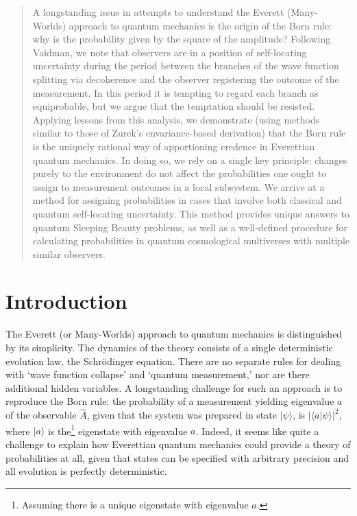 \documentclass[onecolumn,secnumarabic,amsmath,amssymb,balancelastpage,nofootinbib]{article}
\begin{document}
\maketitle
\begin{abstract}
A longstanding issue in attempts to understand the Everett (Many-Worlds) approach to quantum mechanics is the origin of the Born rule: why is the probability given by the square of the amplitude? Following Vaidman, we note that observers are in a position of self-locating uncertainty during the period between the branches of the wave function splitting via decoherence and the observer registering the outcome of the measurement. In this period it is tempting to regard each branch as equiprobable, but we argue that the temptation should be resisted.  Applying lessons from this analysis, we demonstrate (using methods similar to those of Zurek's envariance-based derivation) that the Born rule is the uniquely rational way of apportioning credence in Everettian quantum mechanics.  In doing so, we rely on a single key principle: changes purely to the environment do not affect the probabilities one ought to assign to measurement outcomes in a local subsystem.  We arrive at a method for assigning probabilities in cases that involve both classical and quantum self-locating uncertainty. This method provides unique answers to quantum Sleeping Beauty problems, as well as a well-defined procedure for calculating probabilities in quantum cosmological multiverses with multiple similar observers.
\end{abstract}
\newpage

\tableofcontents

\newpage

\section{Introduction}

The Everett (or Many-Worlds) approach to quantum mechanics is distinguished by its simplicity. The dynamics of the theory consists of a single deterministic evolution law, the Schr\"odinger equation.   There are no separate rules for dealing with `wave function collapse' and `quantum measurement,' nor are there additional hidden variables. A longstanding challenge for such an approach is to reproduce the Born rule: the probability of a measurement yielding eigenvalue $a$ of the observable $\widehat{A}$, given that the system was prepared in state $|\psi\rangle$, is $|\langle a|\psi\rangle|^2$, where $|a\rangle$ is the\footnote{Assuming there is a unique eigenstate with eigenvalue $a$.} eigenstate with eigenvalue $a$. Indeed, it seems like quite a challenge to explain how Everettian quantum mechanics could provide a theory of probabilities at all, given that states can be specified with arbitrary precision and all evolution is perfectly deterministic.
\end{document}
